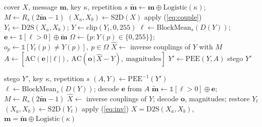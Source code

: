\begin{algorithm}[t]
\caption{Embedding}\label{alg:emb}
\begin{algorithmic}[1]
\Require cover $X$, message $\mathbf m$, key $\kappa$, repetition $s$
\State $\tilde{\mathbf m}\gets\mathbf m\oplus\mathrm{Logistic}(\kappa)$; $M\gets R_s(2\tilde{\mathbf m}-1)$
\State $(X_a,X_b)\gets\mathrm{S2D}(X)$
 apply (\ref{eq:couple}) \EndFor
\State $Y_t\gets\mathrm{D2S}(X_a,X_b)$; $Y\gets\mathrm{clip}(Y_t,0,255)$
\State $\boldsymbol\ell\gets\mathrm{BlockMean}_s(D(Y))$; $\mathbf e\gets\mathbb 1[\boldsymbol\ell>0]\oplus\tilde{\mathbf m}$
\State $\Omega\gets\{p:Y(p)\in\{0,255\}\}$; $o_p\gets\mathbb 1[Y_t(p)\neq Y(p)],\ p\in\Omega$
\State $\hat X\gets$ inverse couplings of $Y$ with $M$ 
\State $A\gets[\mathrm{AC}(\mathbf e\,|\,|\boldsymbol\ell|),\ \mathrm{AC}(\mathbf o\,|\,\hat X{-}Y),\ \text{magnitudes}]$
\State $Y'\gets\mathrm{PEE}(Y,A)$ 
\State \Return stego $Y'$
\end{algorithmic}
\end{algorithm}

\begin{algorithm}[t]
\caption{Extraction and recovery}\label{alg:ext}
\begin{algorithmic}[1]
\Require stego $Y'$, key $\kappa$, repetition $s$
\State $(A,Y)\gets\mathrm{PEE}^{-1}(Y')$ 
\State $\boldsymbol\ell\gets\mathrm{BlockMean}_s(D(Y))$; decode $\mathbf e$ from $A$
\State $\tilde{\mathbf m}\gets\mathbb 1[\boldsymbol\ell>0]\oplus\mathbf e$; $M\gets R_s(2\tilde{\mathbf m}-1)$
\State $\hat X\gets$ inverse couplings of $Y$; decode $\mathbf o$, magnitudes; restore $Y_t$
\State $(X_a,X_b)\gets\mathrm{S2D}(Y_t)$
 apply (\ref{eq:inv}) \EndFor
\State \Return $X=\mathrm{D2S}(X_a,X_b)$, $\mathbf m=\tilde{\mathbf m}\oplus\mathrm{Logistic}(\kappa)$
\end{algorithmic}
\end{algorithm}

